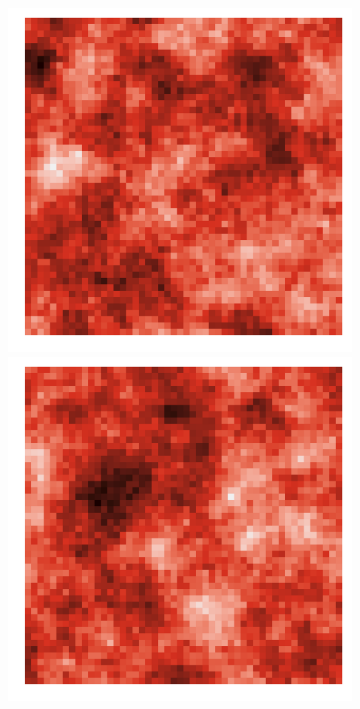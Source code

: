 \documentclass{article}
\begin{document}
\begin{figure}
\begin{subfigure}{0.3\textwidth}
 		\includegraphics[width=\linewidth]{figures/p_realistic4}\\
 		\includegraphics[width=\linewidth]{figures/p_realistic5}\\

\end{subfigure}
\end{figure}
\end{document}
